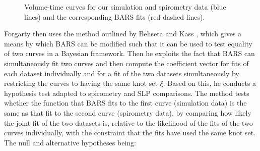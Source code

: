 \begin{figure}
\centering


\caption[Simulation and spirometry data and the corresponding BARS fits]{\label{fig:bars_fitting}Volume-time curves for  our simulation and  spirometry data (blue lines) and the corresponding BARS fits (red dashed lines).
}
\end{figure}

Forgarty \cite{fogarty2011slp} then uses the method outlined by Behseta and Kass \cite{behseta2005testing}, which gives a means by which BARS can be modified such that it can be used to test equality of two curves in a Bayesian framework. Then he exploits the fact that BARS can simultaneously fit two curves and then compute the coefficient vector for fits of each dataset individually and for a fit of the two datasets simultaneously by restricting the curves to having the same knot set $\xi$. Based on this, he conducts a hypothesis test adapted to spirometry and SLP comparisons. The method tests whether the function that BARS fits to the first curve (simulation data) is the same as that fit to the second curve (spirometry data), by comparing how likely the joint fit of the two datasets is, relative to the likelihood of the fits of the two curves individually, with the constraint that the fits have used the same knot set. The null and alternative hypotheses being:

